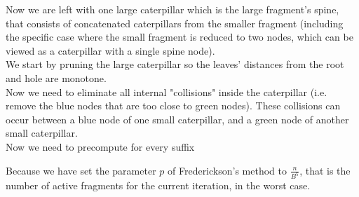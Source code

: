 \documentclass[11pt,a4paper]{article}
\theoremstyle{definition}
\theoremstyle{remark}
\begin{document}
Now we are left with one large caterpillar which is the large fragment's spine, that consists of concatenated caterpillars from the smaller fragment (including the specific case where the small fragment is reduced to two nodes, which can be viewed as a caterpillar with a single spine node).\\
We start by pruning the large caterpillar so the leaves' distances from the root and hole are monotone.\\

Now we need to eliminate all internal "collisions" inside the caterpillar (i.e. remove the blue nodes that are too close to green nodes). These collisions can occur between a blue node of one small caterpillar, and a green node of another small caterpillar.\\

Now we need to precompute for every suffix

Because we have set the parameter $p$ of Frederickson's method to $\frac{n}{B^5}$, that is the number of active fragments for the current iteration, in the worst case.




\end{document}

